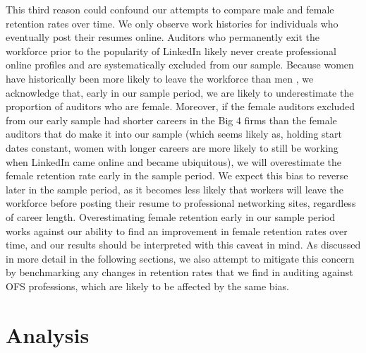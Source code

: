 \documentclass[11pt]{article}
\begin{document}
        This third reason could confound our attempts to compare male and female retention rates over time. We only observe work histories for individuals who eventually post their resumes online. Auditors who permanently exit the workforce prior to the popularity of LinkedIn likely never create professional online profiles and are systematically excluded from our sample. Because women have historically been more likely to leave the workforce than men \parencite{blauFemaleLaborSupply2013}, we acknowledge that, early in our sample period, we are likely to underestimate the proportion of auditors who are female. Moreover, if the female auditors excluded from our early sample had shorter careers in the Big 4 firms than the female auditors that do make it into our sample (which seems likely as, holding start dates constant, women with longer careers are more likely to still be working when LinkedIn came online and became ubiquitous), we will overestimate the female retention rate early in the sample period. We expect this bias to reverse later in the sample period, as it becomes less likely that workers will leave the workforce before posting their resume to professional networking sites, regardless of career length. Overestimating female retention early in our sample period works against our ability to find an improvement in female retention rates over time, and our results should be interpreted with this caveat in mind. As discussed in more detail in the following sections, we also attempt to mitigate this concern by benchmarking any changes in retention rates that we find in auditing against OFS professions, which are likely to be affected by the same bias. 
    
\section{Analysis}\label{section:analysis} 
\end{document}
